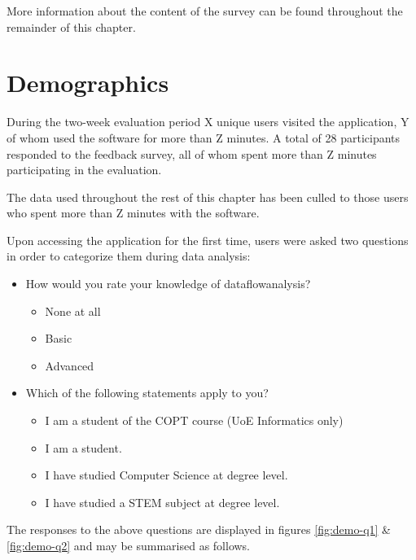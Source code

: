 \documentclass[bsc,twoside,singlespacing,parskip,logo,notimes,normalheadings]{infthesis}
\begin{document}
        More information about the content of the survey can be found
        throughout the remainder of this chapter.

    \section{Demographics}
    
    During the two-week evaluation period X unique users visited the
    application, Y of whom used the software for more than Z
    minutes. A total of 28 participants responded to the feedback
    survey, all of whom spent more than Z minutes participating in the
    evaluation.

    The data used throughout the rest of this chapter has been culled
    to those users who spent more than Z minutes with the software.

    Upon accessing the application for the first time, users were
    asked two questions in order to categorize them during data
    analysis:

    \begin{itemize}
    \item How would you rate your knowledge of
      \gls{dataflowanalysis}?
      \begin{itemize}
      \item None at all
      \item Basic
      \item Advanced
      \end{itemize}
    \item Which of the following statements apply to you?
      \begin{itemize}
      \item I am a student of the COPT course (UoE Informatics
        only)
      \item I am a student.
      \item I have studied Computer Science at degree level.
      \item I have studied a STEM subject at degree level.
      \end{itemize}
    \end{itemize}

    The responses to the above questions are displayed in figures
    \ref{fig:demo-q1} \& \ref{fig:demo-q2} and may be summarised as
    follows.
    
    

    



\end{document}
